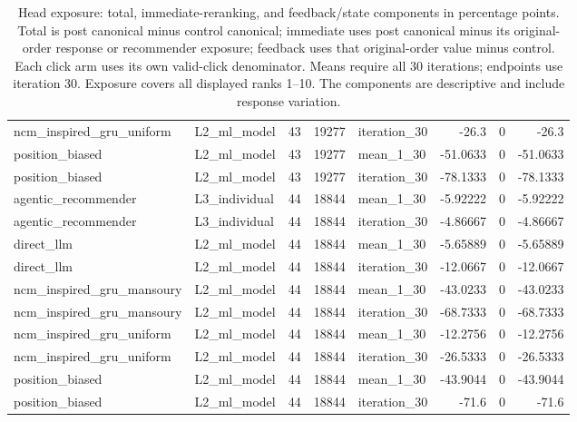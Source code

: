 \begin{table}[htbp!]
\begin{tabular}{llrrlrrr}
ncm\_inspired\_gru\_uniform & L2\_ml\_model & 43 & 19277 & iteration\_30 & -26.3 & 0 & -26.3 \\
position\_biased & L2\_ml\_model & 43 & 19277 & mean\_1\_30 & -51.0633 & 0 & -51.0633 \\
position\_biased & L2\_ml\_model & 43 & 19277 & iteration\_30 & -78.1333 & 0 & -78.1333 \\
agentic\_recommender & L3\_individual & 44 & 18844 & mean\_1\_30 & -5.92222 & 0 & -5.92222 \\
agentic\_recommender & L3\_individual & 44 & 18844 & iteration\_30 & -4.86667 & 0 & -4.86667 \\
direct\_llm & L2\_ml\_model & 44 & 18844 & mean\_1\_30 & -5.65889 & 0 & -5.65889 \\
direct\_llm & L2\_ml\_model & 44 & 18844 & iteration\_30 & -12.0667 & 0 & -12.0667 \\
ncm\_inspired\_gru\_mansoury & L2\_ml\_model & 44 & 18844 & mean\_1\_30 & -43.0233 & 0 & -43.0233 \\
ncm\_inspired\_gru\_mansoury & L2\_ml\_model & 44 & 18844 & iteration\_30 & -68.7333 & 0 & -68.7333 \\
ncm\_inspired\_gru\_uniform & L2\_ml\_model & 44 & 18844 & mean\_1\_30 & -12.2756 & 0 & -12.2756 \\
ncm\_inspired\_gru\_uniform & L2\_ml\_model & 44 & 18844 & iteration\_30 & -26.5333 & 0 & -26.5333 \\
position\_biased & L2\_ml\_model & 44 & 18844 & mean\_1\_30 & -43.9044 & 0 & -43.9044 \\
position\_biased & L2\_ml\_model & 44 & 18844 & iteration\_30 & -71.6 & 0 & -71.6 \\
\hline
\end{tabular}
\caption{Head exposure: total, immediate-reranking, and feedback/state components in percentage points. Total is post canonical minus control canonical; immediate uses post canonical minus its original-order response or recommender exposure; feedback uses that original-order value minus control. Each click arm uses its own valid-click denominator. Means require all 30 iterations; endpoints use iteration 30. Exposure covers all displayed ranks 1--10. The components are descriptive and include response variation.}
\label{chap:results:tab:rq4_post_processing_head_exposure_components}
\end{table}
